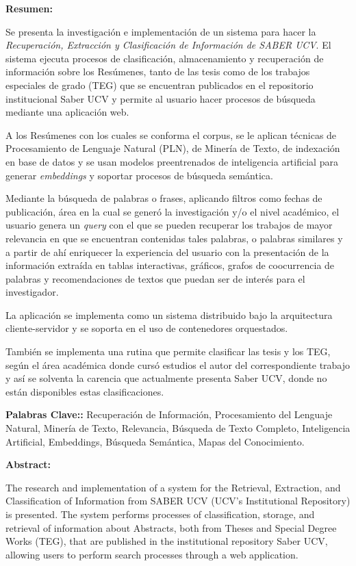 \documentclass[
  10,
  openany]{book}
\begin{document}
\newpage
\thispagestyle{empty}
\large{\textbf{Resumen:}}

Se presenta la investigación e implementación de un sistema para hacer la \emph{Recuperación, Extracción y Clasificación de Información de SABER UCV}. El sistema ejecuta procesos de clasificación, almacenamiento y recuperación de información sobre los Resúmenes, tanto de las tesis como de los trabajos especiales de grado (TEG) que se encuentran publicados en el repositorio institucional Saber UCV y permite al usuario hacer procesos de búsqueda mediante una aplicación web.

A los Resúmenes con los cuales se conforma el corpus, se le aplican técnicas de Procesamiento de Lenguaje Natural (PLN), de Minería de Texto, de indexación en base de datos y se usan modelos preentrenados de inteligencia artificial para generar \textit{embeddings} y soportar procesos de búsqueda semántica.

Mediante la búsqueda de palabras o frases, aplicando filtros como fechas de publicación, área en la cual se generó la investigación y/o el nivel académico, el usuario genera un \textit{query} con el que se pueden recuperar los trabajos de mayor relevancia en que se encuentran contenidas tales palabras, o palabras similares y a partir de ahí enriquecer la experiencia del usuario con la presentación de la información extraída en tablas interactivas, gráficos, grafos de coocurrencia de palabras y recomendaciones de textos que puedan ser de interés para el investigador.

La aplicación se implementa como un sistema distribuido bajo la arquitectura cliente-servidor y se soporta en el uso de contenedores orquestados.

También se implementa una rutina que permite clasificar las tesis y los TEG, según el área académica donde cursó estudios el autor del correspondiente trabajo y así se solventa la carencia que actualmente presenta Saber UCV, donde no están disponibles estas clasificaciones.

\vspace*{2cm}

\textbf{Palabras Clave::} Recuperación de Información, Procesamiento del Lenguaje Natural,  Minería de Texto, Relevancia, Búsqueda de Texto Completo, Inteligencia Artificial, Embeddings, Búsqueda Semántica, Mapas del Conocimiento.



\newpage
\thispagestyle{empty}
\large{\textbf{Abstract:}}

The research and implementation of a system for the Retrieval, Extraction, and Classification of Information from SABER UCV (UCV's Institutional Repository) is presented. The system performs processes of classification, storage, and retrieval of information about Abstracts, both from Theses and Special Degree Works (TEG), that are published in the institutional repository Saber UCV, allowing users to perform search processes through a web application.
\end{document}
